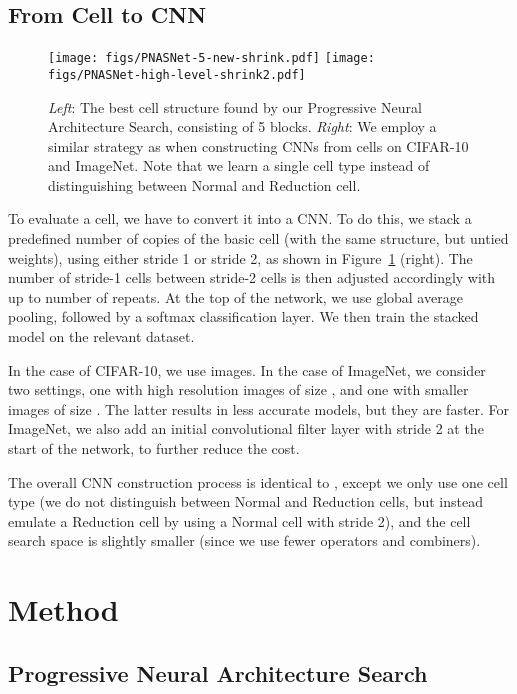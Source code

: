 \documentclass[runningheads]{llncs}
\begin{document}
\subsection{From Cell to CNN}

\begin{figure}[t]
\centering
\texttt{[image: figs/PNASNet-5-new-shrink.pdf]}
\qquad
\texttt{[image: figs/PNASNet-high-level-shrink2.pdf]}
\caption{
\emph{Left}: 
The best cell structure found by our Progressive Neural Architecture Search, consisting of 5 blocks.
\emph{Right}:
We employ a similar strategy as \cite{DBLP:journals/corr/ZophVSL17} when constructing CNNs from cells on CIFAR-10 and ImageNet. 
Note that we learn a single cell type instead of distinguishing between Normal and Reduction cell.
}
\label{fig:network}
\end{figure}

To evaluate a cell, we have to convert it into a CNN.
To do this, 
we stack a predefined number of copies of the basic cell (with the same structure, but untied weights),
using either stride 1 or stride 2, as shown in 
Figure~\ref{fig:network} (right). 
The number of stride-1 cells between stride-2 cells is then adjusted accordingly with up to  number of repeats.
At the top of the network, we use global average pooling, followed by a softmax classification layer.
We then train the stacked model on the relevant dataset.

In the case of CIFAR-10, we use  images.
In the case of ImageNet, we consider two settings,
one with high resolution images of size ,
and one with smaller images of size .
The latter results in less accurate models, but they are faster.
For ImageNet,
we also add an initial  convolutional filter layer  with stride 2 at the start of the network, to further reduce the cost.

The overall CNN construction process is identical to  \cite{DBLP:journals/corr/ZophVSL17},
except we only use one cell type (we do not distinguish between Normal and Reduction cells, but instead emulate a Reduction cell by using a Normal cell with stride 2),
and the cell search space is slightly smaller (since we use fewer operators and combiners). 
\section{Method}
\label{sec:methods}
\label{sec:method}

\subsection{Progressive Neural Architecture Search}
\label{sec:pnas}
\end{document}
